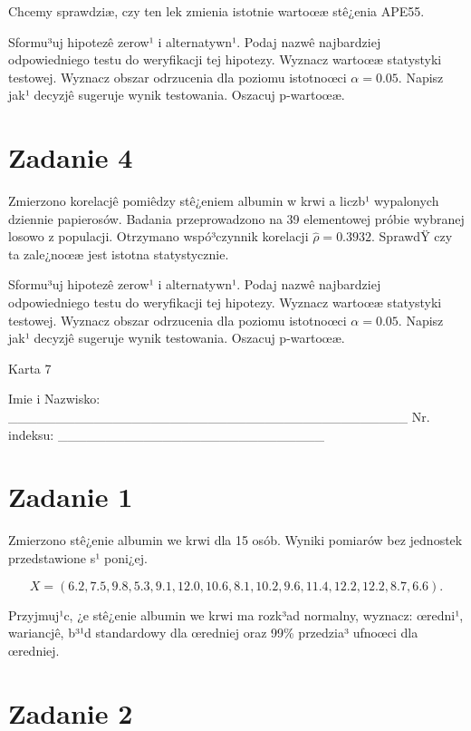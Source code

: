 \documentclass[a4paper,12pt]{article}
\begin{document}
  Chcemy sprawdziæ, czy ten lek zmienia istotnie wartoœæ stê¿enia APE55.
  
  Sformu³uj hipotezê zerow¹ i alternatywn¹. 
  Podaj nazwê najbardziej odpowiedniego testu do weryfikacji tej hipotezy. 
  Wyznacz wartoœæ statystyki testowej. 
  Wyznacz obszar odrzucenia dla poziomu istotnoœci $\alpha=0.05$. 
  Napisz jak¹ decyzjê sugeruje wynik testowania. Oszacuj p-wartoœæ. \vspace{1cm} 

  \section*{Zadanie 4}
     
     Zmierzono korelacjê pomiêdzy stê¿eniem albumin w krwi a liczb¹ wypalonych dziennie papierosów. 
     Badania przeprowadzono na 39 elementowej próbie wybranej losowo z populacji. 
     Otrzymano wspó³czynnik korelacji $\hat\rho = 0.3932 $. 
     SprawdŸ czy ta zale¿noœæ jest istotna statystycznie. 
     
     Sformu³uj hipotezê zerow¹ i alternatywn¹. 
     Podaj nazwê najbardziej odpowiedniego testu do weryfikacji tej hipotezy. 
     Wyznacz wartoœæ statystyki testowej. 
     Wyznacz obszar odrzucenia dla poziomu istotnoœci $\alpha=0.05$. 
     Napisz jak¹ decyzjê sugeruje wynik testowania. 
     Oszacuj p-wartoœæ. \vspace{1cm} 

  \clearpage  Karta  7  

 Imie i Nazwisko: \_\_\_\_\_\_\_\_\_\_\_\_\_\_\_\_\_\_\_\_\_\_\_\_\_\_\_\_\_\_\_\_\_\_\_\_\_\_\_\_\_\_ Nr. indeksu: \_\_\_\_\_\_\_\_\_\_\_\_\_\_\_\_\_\_\_\_\_\_\_\_\_\_\_\_ 
 \section*{Zadanie 1}
     
     Zmierzono stê¿enie albumin we krwi dla 15 osób. 
     Wyniki pomiarów bez jednostek przedstawione s¹ poni¿ej. 
     
     \noindent $$X=(  6.2,  7.5,  9.8,  5.3,  9.1, 12.0, 10.6,  8.1, 10.2,  9.6, 11.4, 12.2, 12.2,  8.7,  6.6 ).$$
     
     Przyjmuj¹c, ¿e stê¿enie albumin we krwi ma rozk³ad normalny, 
     wyznacz: œredni¹, wariancjê, b³¹d standardowy dla œredniej oraz 99\% przedzia³ ufnoœci dla œredniej. \vspace{1cm} 

  \section*{Zadanie 2}
     
\end{document}
